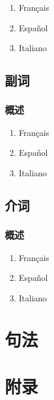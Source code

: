 \documentclass[UTF8,a4paper,titlepage,10pt]{report}
\begin{document}
\begin{enumerate}
\item Français
\label{sec:org1765b90}

\item Español
\label{sec:orgdd3bfcf}

\item Italiano
\label{sec:orgc1fb4cb}
\end{enumerate}

\chapter{副词}
\label{sec:orga1d8ce3}

\section{概述}
\label{sec:orgd598b5f}

\begin{enumerate}
\item Français
\label{sec:orgbf04219}

\item Español
\label{sec:org582e6e3}

\item Italiano
\label{sec:orgbb82fcb}
\end{enumerate}

\chapter{介词}
\label{sec:org9bd90f2}

\section{概述}
\label{sec:org7de173a}

\begin{enumerate}
\item Français
\label{sec:orga7f5d84}

\item Español
\label{sec:orga1a94ad}

\item Italiano
\label{sec:org035b36b}
\end{enumerate}

\part{句法}
\label{sec:orgee6fde4}

\newpage
\part{附录}
\label{sec:org8ec715a}

\listoftables

\listoffigures

\printindex
\end{document}

